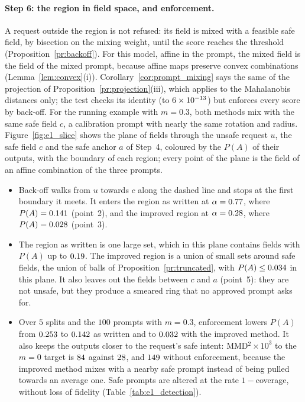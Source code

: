 \documentclass{article}
\theoremstyle{plain}
\theoremstyle{remark}
\begin{document}
\paragraph{Step 6: the region in field space, and enforcement.}
A request outside the region is not refused: its field is mixed with a feasible safe field, by bisection on the
mixing weight, until the score reaches the threshold (Proposition~\ref{pr:backoff}). For this model, affine in the prompt,
the mixed field is the field of the mixed prompt, because affine maps preserve convex combinations (Lemma~\ref{lem:convex}(i)).
Corollary~\ref{cor:prompt_mixing} says the same of the projection of Proposition~\ref{pr:projection}(iii), which applies to the Mahalanobis
distances only; the test checks its identity (to $6\times10^{-13}$) but enforces every score by back-off. For the running example with
$m=0.3$, both methods mix with the same safe field $c$, a calibration prompt with nearly the same rotation and radius.
Figure~\ref{fig:e1_slice} shows the plane of fields through the unsafe request $u$, the safe field $c$ and the safe anchor $a$ of
Step~4, coloured by the $P(A)$ of their outputs, with the boundary of each region; every point of the plane is the
field of an affine combination of the three prompts.
\begin{itemize}
\item Back-off walks from $u$ towards $c$ along the dashed line and stops at the first boundary it meets. It enters the
region as written at $\alpha=0.77$, where $P(A)=0.141$ (point~2), and the improved region at $\alpha=0.28$, where
$P(A)=0.028$ (point~3).
\item The region as written is one large set, which in this plane contains fields with $P(A)$ up to $0.19$. The
improved region is a union of small sets around safe fields, the union of balls of Proposition~\ref{pr:truncated}, with
$P(A)\le0.034$ in this plane. It also leaves out the fields between $c$ and $a$ (point~5): they are not unsafe, but
they produce a smeared ring that no approved prompt asks for.
\item Over $5$ splits and the $100$ prompts with $m=0.3$, enforcement lowers $P(A)$ from $0.253$ to $0.142$ as written and to
$0.032$ with the improved method. It also keeps the outputs closer to the request's safe intent: MMD$^2\times10^3$ to the
$m=0$ target is $84$ against $28$, and $149$ without enforcement, because the improved method mixes
with a nearby safe prompt instead of being pulled towards an average one. Safe prompts are altered at the rate
$1-$coverage, without loss of fidelity (Table~\ref{tab:e1_detection}).
\end{itemize}
\end{document}
